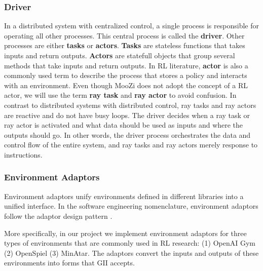 \documentclass[12pt]{article}
\begin{document}
\subsubsection{Driver}
In a distributed system with centralized control, a single process is responsible for operating all other processes.
This central process is called the \textbf{driver}.
Other processes are either \textbf{tasks} or \textbf{actors}.
\textbf{Tasks} are stateless functions that takes inputs and return outputs.
\textbf{Actors} are statefull objects that group several methods that take inputs and return outputs.
In RL literature, \textbf{actor} is also a commonly used term to describe the process that stores a policy and interacts with an environment.
Even though MooZi does not adopt the concept of a RL actor, we will use the term \textbf{ray task} and \textbf{ray actor} to avoid confusion.
In contrast to distributed systems with distributed control, ray tasks and ray actors are reactive and do not have busy loops.
The driver decides when a ray task or ray actor is activated and what data should be used as inputs and where the outputs should go.
In other words, the driver process orchestrates the data and control flow of the entire system, and ray tasks and ray actors merely response to instructions.

\subsubsection{Environment Adaptors}
Environment adaptors unify environments defined in different libraries into a unified interface.
In the software engineering nomenclature, environment adaptors follow the adaptor design pattern \cite{AdapterPattern__2022}.

More specifically, in our project we implement environment adaptors for three types of environments that are commonly used in RL research:
(1) OpenAI Gym (2) OpenSpiel (3) MinAtar.
The adaptors convert the inputs and outputs of these environments into forms that GII accepts.


\end{document}
